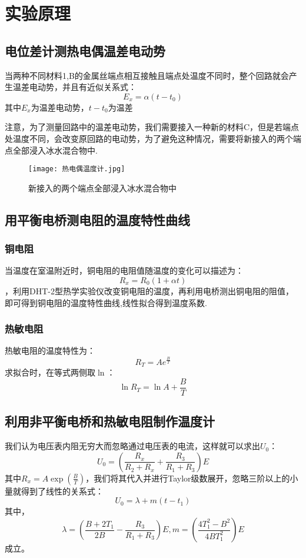 \documentclass[11pt]{article}
\begin{document}
\section{实验原理}

\subsection{电位差计测热电偶温差电动势}
当两种不同材料1,B的金属丝端点相互接触且端点处温度不同时，整个回路就会产生温差电动势，并且有近似关系式：\[E_x=\alpha(t-t_0)\]其中$E_x$为温差电动势，$t-t_0$为温差\newline

注意，为了测量回路中的温差电动势，我们需要接入一种新的材料C，但是若端点处温度不同，会改变原回路的电动势，为了避免这种情况，需要将新接入的两个端点全部浸入冰水混合物中.
\begin{figure}[htbp]
	\centering
	\texttt{[image: 热电偶温度计.jpg]}
	\caption{新接入的两个端点全部浸入冰水混合物中}
	\label{fig:冰水混合物}
\end{figure}

\subsection{用平衡电桥测电阻的温度特性曲线}
\subsubsection{铜电阻}
当温度在室温附近时，铜电阻的电阻值随温度的变化可以描述为：\[R_x=R_0(1+\alpha t)\]，利用DHT-2型热学实验仪改变铜电阻的温度，再利用电桥测出铜电阻的阻值，即可得到铜电阻的温度特性曲线,线性拟合得到温度系数.
\subsubsection{热敏电阻}
热敏电阻的温度特性为：
\begin{displaymath}
	R_T=A e^{\frac{B}{T}}
\end{displaymath}
求拟合时，在等式两侧取$\ln$：
\begin{displaymath}
	\ln R_T=\ln A+\frac{B}{T}
\end{displaymath}

\subsection{利用非平衡电桥和热敏电阻制作温度计}
我们认为电压表内阻无穷大而忽略通过电压表的电流，这样就可以求出$U_0$：\begin{displaymath}U_0=\left( \frac{R_x}{R_2+R_x}+\frac{R_3}{R_1+R_3}\right)E\end{displaymath}其中$R_x=A\exp \left(\frac{B}{T}\right)$，我们将其代入并进行Taylor级数展开，忽略三阶以上的小量就得到了线性的关系式：\begin{displaymath}U_0=\lambda+m(t-t_1)\end{displaymath}其中，\begin{displaymath}\lambda=\left(\frac{B+2T_1}{2B}-\frac{R_3}{R_1+R_3}\right)E,m=\left(\frac{4T_1^2-B^2}{4BT_1^2}\right)E\end{displaymath}成立。
\end{document}
